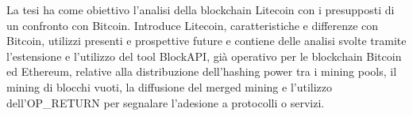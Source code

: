 \vspace{4cm}
La tesi ha come obiettivo l'analisi della blockchain Litecoin con i presupposti di un confronto con Bitcoin. Introduce Litecoin, caratteristiche e differenze con Bitcoin, utilizzi presenti e prospettive future e contiene delle analisi svolte tramite l’estensione e l’utilizzo del tool BlockAPI, già operativo per le blockchain Bitcoin ed Ethereum, relative alla distribuzione dell’hashing power tra i mining pools, il mining di blocchi vuoti, la diffusione del merged mining e l’utilizzo dell’OP\_RETURN per segnalare l’adesione a protocolli o servizi.